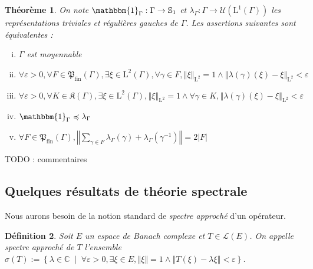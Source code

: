 \documentclass[a4paper,12pt]{article}
\newtheorem{theorem}{Théorème}[section]
\newtheorem{definition}[theorem]{Définition}
\newcommand{\C}{\mathbb{C}}
\newcommand{\norm}[1]{\left\Vert #1\right\Vert}
\newcommand{\abs}[1]{\left\vert#1\right\vert}
\newcommand{\card}[1]{\abs{#1}}
\newcommand{\set}[1]{\left\{ #1 \right\}}
\newcommand{\indic}{\mathbbm{1}}
\newcommand{\tq}{\;\middle|\;}
\newcommand{\inv}{^{-1}}
\newcommand{\finparts}{\mathfrak{P}_{\mathrm{fin}}}
\newcommand{\TODO}[1]{{\color{red}TODO :} #1}
\newcommand{\wle}{\preccurlyeq}
\DeclareMathOperator{\Sp}{Sp}
\begin{document}
\begin{theorem}\label{amenable_weak_contain}
    On note $\indic_\Gamma:\Gamma\to\mathbb{S}_1$ et $\lambda_\Gamma:\Gamma\to\mathcal{U}(\mathrm{L}^1(\Gamma))$
    les représentations triviales et régulières gauches de $\Gamma$. Les assertions suivantes sont équivalentes :
    \begin{enumerate}[(i)]
        \item\label{amenable_weak_contain/amenable} $\Gamma$ est moyennable
        \item\label{amenable_weak_contain/weak_almost_invariant} $\forall\varepsilon>0, \forall F\in\finparts(\Gamma), \exists\xi\in \mathrm{L}^2(\Gamma), \forall \gamma\in F, \norm{\xi}_{\mathrm{L}^2} = 1 \land \norm{\lambda(\gamma)(\xi) - \xi}_{\mathrm{L}^2}<\varepsilon$
        \item\label{amenable_weak_contain/strong_almost_invariant} $\forall\varepsilon>0, \forall K\in\mathfrak{K}(\Gamma), \exists\xi\in \mathrm{L}^2(\Gamma), \norm{\xi}_{\mathrm{L}^2} = 1 \land \forall \gamma\in K, \norm{\lambda(\gamma)(\xi) - \xi}_{\mathrm{L}^2}<\varepsilon$
        \item\label{amenable_weak_contain/weak_contain} $\indic_\Gamma\wle\lambda_\Gamma$
        \item\label{amenable_weak_contain/norm_eq_two} $\forall F\in\finparts(\Gamma), \norm{\sum_{\gamma\in F}\lambda_\Gamma(\gamma)+\lambda_\Gamma(\gamma\inv)} = 2\card{F}$
    \end{enumerate}
\end{theorem}

\TODO{commentaires}

\subsection{Quelques résultats de théorie spectrale}

Nous aurons besoin de la notion standard de \emph{spectre approché} d'un opérateur.

\begin{definition}
    Soit $E$ un espace de Banach complexe et $T\in\mathcal{L}(E)$. 
    On appelle \emph{spectre approché de $T$} l'ensemble $\sigma(T) := \set{\lambda\in\C\tq\forall\varepsilon>0, \exists\xi\in E, \norm{\xi}=1\land\norm{T(\xi)-\lambda\xi}<\varepsilon}$.
\end{definition}
\end{document}
